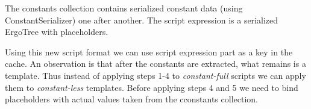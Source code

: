 The constants collection contains serialized constant data (using
ConstantSerializer) one after another.
The script expression is a serialized ErgoTree with placeholders.

Using this new script format we can use script expression part as a key in
the cache. An observation is that after the constants are extracted, what
remains is a template. Thus instead of applying steps 1-4 to
\emph{constant-full} scripts we can apply them to \emph{constant-less}
templates. Before applying steps 4 and 5 we need to bind placeholders with
actual values taken from the cconstants collection.
